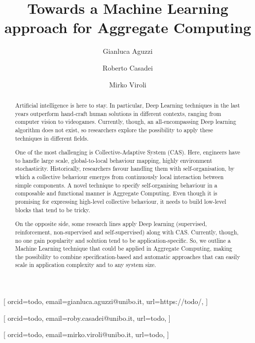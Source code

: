 \documentclass[
  twocolumn,
]{ceurart}
\begin{document}

\title{Towards a Machine Learning approach for Aggregate Computing} %

\author[1]{Gianluca Aguzzi}[%
 orcid=todo,
 email=gianluca.aguzzi@unibo.it,
 url=https://todo/,
]

\author[2]{Roberto Casadei}[%
 orcid=todo,
 email=roby.casadei@unibo.it,
 url=todo,
]

\author[3]{Mirko Viroli}[%
 orcid=todo,
 email=mirko.viroli@unibo.it,
 url=todo,
]
\address[1]{Alma Mater Studiorum - Università di Bologna, Cesena, Italy}
\newcommand{\constraints}[1]{\todo[inline, color=red]{#1}}
\newcommand{\suggestions}[1]{\todo[inline, color=yellow]{#1}}
\newcommand{\todos}[1]{\todo[inline, color=cyan]{#1}}
\newcommand{\outline}[1]{\todo[inline, color=green]{#1}}
\newcommand{\hybridaggregate}{\textit{Hybrid Aggregate Computing}}
\newcommand{\round}{\texttt{round}}
\newcommand{\export}{\texttt{export}}
\begin{abstract}
\suggestions{}
Artificial intelligence is here to stay. 
 In particular, Deep Learning techniques in the last years outperform 
 hand-craft human solutions in different contexts, ranging from computer vision to videogames.
%
Currently, though, an all-encompassing Deep learning algorithm does not exist, 
 so researchers explore the possibility to apply these techniques in different fields.

One of the most challenging is Collective-Adaptive System (CAS). %
 Here, engineers have to handle large scale, global-to-local behaviour mapping,
 highly environment stochasticity. 
%
Historically, researchers favour handling them with self-organisation,
 by which a collective behaviour emerges from continuously local interaction between simple components.
%
A novel technique to specify self-organising behaviour in a composable and functional manner is Aggregate Computing. 
 Even though it is promising for expressing high-level collective behaviour, 
 it needs to build low-level blocks that tend to be tricky. 

On the opposite side, some research lines apply Deep learning (supervised, reinforcement, non-supervised and self-supervised)
 along with CAS. Currently, though, no one gain popularity and solution tend to be application-specific.
%
So, we outline a Machine Learning technique that could be applied in Aggregate Computing, 
 making the possibility to combine specification-based and automatic approaches that can easily scale in application complexity and to any system size.
\end{abstract}
\end{document}

